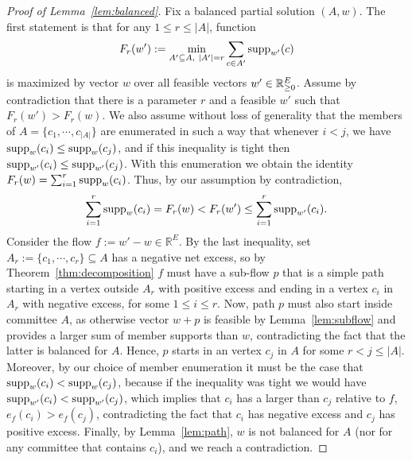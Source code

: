 \begin{proof}[Proof of Lemma~\ref{lem:balanced}]
Fix a balanced partial solution $(A,w)$. The first statement is that for any $1\leq r\leq |A|$, function 
%
$$F_r(w'):=\min_{A'\subseteq A, \ |A'|=r} \sum_{c\in A'} \supp_{w'}(c)$$
% 
is maximized by vector $w$ over all feasible vectors $w'\in\mathbb{R}_{\geq 0}^E$. 
Assume by contradiction that there is a parameter $r$ and a feasible $w'$ such that $F_r(w')>F_r(w)$. 
We also assume without loss of generality that the members of $A=\{c_1, \cdots, c_{|A|}\}$ are enumerated in such a way that whenever $i<j$, we have $\operatorname{supp}_w(c_i)\leq \operatorname{supp}_w(c_j)$, and if this inequality is tight then $\operatorname{supp}_{w'}(c_i)\leq \operatorname{supp}_{w'}(c_j)$.
%
With this enumeration we obtain the identity $F_r(w)=\sum_{i=1}^r \operatorname{supp}_w(c_i)$. 
Thus, by our assumption by contradiction, 
$$ \sum_{i=1}^r \operatorname{supp}_{w}(c_i) = F_r(w) < F_r(w') \leq  \sum_{i=1}^r \operatorname{supp}_{w'}(c_i). $$
%
%
Consider the flow $f:=w'-w\in\mathbb{R}^E$. 
By the last inequality, set $A_r:=\{c_1, \cdots, c_r\}\subseteq A$ has a negative net excess, so by Theorem~\ref{thm:decomposition} $f$ must have a sub-flow $p$ that is a simple path starting in a vertex outside $A_r$ with positive excess and ending in a vertex $c_i$ in $A_r$ with negative excess, for some $1\leq i\leq r$. 
Now, path $p$ must also start inside committee $A$, as otherwise vector $w+p$ is feasible by Lemma~\ref{lem:subflow} and provides a larger sum of member supports than $w$, contradicting the fact that the latter is balanced for $A$. 
Hence, $p$ starts in an vertex $c_j$ in $A$ for some $r<j\leq |A|$. 
Moreover, by our choice of member enumeration it must be the case that $\operatorname{supp}_w(c_i)<\operatorname{supp}_w(c_j)$, because if the inequality was tight we would have $\operatorname{supp}_{w'}(c_i)<\operatorname{supp}_{w'}(c_j)$, which implies that $c_i$ has a larger than $c_j$ relative to $f$, $e_f(c_i)> e_f(c_j)$, contradicting the fact that $c_i$ has negative excess and $c_j$ has positive excess.
Finally, by Lemma~\ref{lem:path}, $w$ is not balanced for $A$ (nor for any committee that contains $c_i$), and we reach a contradiction. 


\end{proof}
